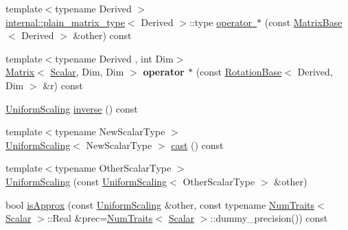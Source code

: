 \begin{DoxyCompactItemize}
\item 
{\footnotesize template$<$typename Derived $>$ }\\\mbox{\hyperlink{struct_eigen_1_1internal_1_1plain__matrix__type}{internal\+::plain\+\_\+matrix\+\_\+type}}$<$ Derived $>$\+::type \mbox{\hyperlink{class_eigen_1_1_uniform_scaling_abec8e8c16a306e1fe7658467b64ac257}{operator $\ast$}} (const \mbox{\hyperlink{class_eigen_1_1_matrix_base}{Matrix\+Base}}$<$ Derived $>$ \&other) const
\item 
\mbox{\label{class_eigen_1_1_uniform_scaling_a4aa60489aa95608bcf7a6eec4e0d1fb1}} 
{\footnotesize template$<$typename Derived , int Dim$>$ }\\\mbox{\hyperlink{class_eigen_1_1_matrix}{Matrix}}$<$ \mbox{\hyperlink{class_eigen_1_1_uniform_scaling_a04c4339f58f1210c5d4d34b1bd7ae283}{Scalar}}, Dim, Dim $>$ {\bfseries operator $\ast$} (const \mbox{\hyperlink{class_eigen_1_1_rotation_base}{Rotation\+Base}}$<$ Derived, Dim $>$ \&r) const
\item 
\mbox{\hyperlink{class_eigen_1_1_uniform_scaling}{Uniform\+Scaling}} \mbox{\hyperlink{class_eigen_1_1_uniform_scaling_a60dba22bebe9e2c97cfbc76f85eb1b78}{inverse}} () const
\item 
{\footnotesize template$<$typename New\+Scalar\+Type $>$ }\\\mbox{\hyperlink{class_eigen_1_1_uniform_scaling}{Uniform\+Scaling}}$<$ New\+Scalar\+Type $>$ \mbox{\hyperlink{class_eigen_1_1_uniform_scaling_af93a9ee1d6efc102b65a197f3ea3d4cd}{cast}} () const
\item 
{\footnotesize template$<$typename Other\+Scalar\+Type $>$ }\\\mbox{\hyperlink{class_eigen_1_1_uniform_scaling_a898cc0c97625ce671d7ea951f6eb2fc4}{Uniform\+Scaling}} (const \mbox{\hyperlink{class_eigen_1_1_uniform_scaling}{Uniform\+Scaling}}$<$ Other\+Scalar\+Type $>$ \&other)
\item 
bool \mbox{\hyperlink{class_eigen_1_1_uniform_scaling_a7f736fdbe43f7bce3d277312efdc315e}{is\+Approx}} (const \mbox{\hyperlink{class_eigen_1_1_uniform_scaling}{Uniform\+Scaling}} \&other, const typename \mbox{\hyperlink{struct_eigen_1_1_num_traits}{Num\+Traits}}$<$ \mbox{\hyperlink{class_eigen_1_1_uniform_scaling_a04c4339f58f1210c5d4d34b1bd7ae283}{Scalar}} $>$\+::Real \&prec=\mbox{\hyperlink{struct_eigen_1_1_num_traits}{Num\+Traits}}$<$ \mbox{\hyperlink{class_eigen_1_1_uniform_scaling_a04c4339f58f1210c5d4d34b1bd7ae283}{Scalar}} $>$\+::dummy\+\_\+precision()) const
\end{DoxyCompactItemize}
